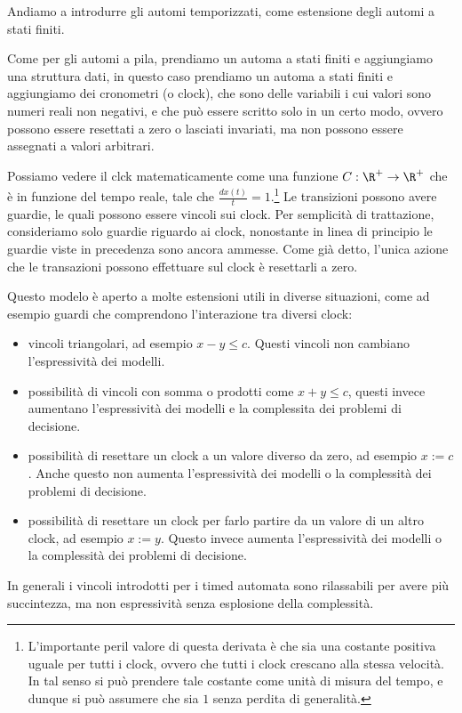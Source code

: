 Andiamo a introdurre gli automi temporizzati, come estensione degli automi a stati finiti.

Come per gli automi a pila, prendiamo un automa a stati finiti e aggiungiamo una struttura dati, in questo caso prendiamo un automa a stati finiti e aggiungiamo dei cronometri (o clock), che sono delle variabili i cui valori sono numeri reali non negativi, e che può essere scritto solo in un certo modo, ovvero possono essere resettati a zero o lasciati invariati, ma non possono essere assegnati a valori arbitrari.

Possiamo vedere il clck matematicamente come una funzione \(C: \R^+ \to \R^+\) che è in funzione del tempo reale, tale che \(\frac{d x(t)}{t} = 1\).\footnote{L'importante peril valore di questa derivata è che sia una costante positiva uguale per tutti i clock, ovvero che tutti i clock crescano alla stessa velocità. In tal senso si può prendere tale costante come unità di misura del tempo, e dunque si può assumere che sia \(1\) senza perdita di generalità.} Le transizioni possono avere guardie, le quali possono essere vincoli sui clock. Per semplicità di trattazione, consideriamo solo guardie riguardo ai clock, nonostante in linea di principio le guardie viste in precedenza sono ancora ammesse. Come già detto, l'unica azione che le transazioni possono effettuare sul clock è resettarli a zero.

\begin{note}{}
  Questo modelo è aperto a molte estensioni utili in diverse situazioni, come ad esempio guardi che comprendono l'interazione tra diversi clock:
  \begin{itemize}
    \item vincoli triangolari, ad esempio \(x-y \leq c\). Questi vincoli non cambiano l'espressività dei modelli.
    \item possibilità di vincoli con somma o prodotti come \(x+y \leq c\), questi invece aumentano l'espressività dei modelli e la complessita dei problemi di decisione.
    \item possibilità di resettare un clock a un valore diverso da zero, ad esempio \(x := c\). Anche questo non aumenta l'espressività dei modelli o la complessità dei problemi di decisione.
    \item possibilità di resettare un clock per farlo partire da un valore di un altro clock, ad esempio \(x := y\). Questo invece aumenta l'espressività dei modelli o la complessità dei problemi di decisione.
  \end{itemize}

  In generali i vincoli introdotti per i timed automata sono rilassabili per avere più succintezza, ma non espressività senza esplosione della complessità.
\end{note}

